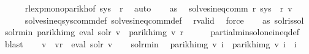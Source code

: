 \begin{isabellebody}
\ \ \ \ \isamarkupfalse%
\ rlexp{\isacharunderscore}{\kern0pt}mono{\isacharunderscore}{\kern0pt}parikh{\isacharbrackleft}{\kern0pt}of\ {\isachardoublequoteopen}sys\ {\isacharbang}{\kern0pt}\ r{\isachardoublequoteclose}{\isacharbrackright}{\kern0pt}\ \isamarkupfalse%
\ auto\isanewline
\ \ \isamarkupfalse%
\ as\ \isamarkupfalse%
\ {\isachardoublequoteopen}solves{\isacharunderscore}{\kern0pt}ineq{\isacharunderscore}{\kern0pt}comm\ r\ {\isacharparenleft}{\kern0pt}sys{\isacharprime}{\kern0pt}\ {\isacharbang}{\kern0pt}\ r{\isacharparenright}{\kern0pt}\ v{}{\isachardoublequoteclose}\isanewline
\ \ \ \ \isamarkupfalse%
\ solves{\isacharunderscore}{\kern0pt}ineq{\isacharunderscore}{\kern0pt}sys{\isacharunderscore}{\kern0pt}comm{\isacharunderscore}{\kern0pt}def\ solves{\isacharunderscore}{\kern0pt}ineq{\isacharunderscore}{\kern0pt}comm{\isacharunderscore}{\kern0pt}def\ \isamarkupfalse%
\ r{\isacharunderscore}{\kern0pt}valid\ \isamarkupfalse%
\ force\isanewline
\ \ \isamarkupfalse%
\ as\ sol{\isacharunderscore}{\kern0pt}r{\isacharunderscore}{\kern0pt}is{\isacharunderscore}{\kern0pt}sol\ \isamarkupfalse%
\ sol{\isacharunderscore}{\kern0pt}r{\isacharunderscore}{\kern0pt}min{\isacharcolon}{\kern0pt}\ {\isachardoublequoteopen}parikh{\isacharunderscore}{\kern0pt}img\ {\isacharparenleft}{\kern0pt}eval\ sol{\isacharunderscore}{\kern0pt}r\ v{}{\isacharparenright}{\kern0pt}\ {\isasymsubseteq}\ parikh{\isacharunderscore}{\kern0pt}img\ {\isacharparenleft}{\kern0pt}v{}\ r{\isacharparenright}{\kern0pt}{\isachardoublequoteclose}\isanewline
\ \ \ \ \isamarkupfalse%
\ partial{\isacharunderscore}{\kern0pt}min{\isacharunderscore}{\kern0pt}sol{\isacharunderscore}{\kern0pt}one{\isacharunderscore}{\kern0pt}ineq{\isacharunderscore}{\kern0pt}def\ \isamarkupfalse%
\ blast\isanewline
\isanewline
\ \ \isamarkupfalse%
\ {\isacharquery}{\kern0pt}v{\isacharprime}{\kern0pt}\ {\isacharequal}{\kern0pt}\ {\isachardoublequoteopen}v{}{\isacharparenleft}{\kern0pt}r\ {\isacharcolon}{\kern0pt}{\isacharequal}{\kern0pt}\ eval\ sol{\isacharunderscore}{\kern0pt}r\ v{}{\isacharparenright}{\kern0pt}{\isachardoublequoteclose}\isanewline
\ \ \isamarkupfalse%
\ sol{\isacharunderscore}{\kern0pt}r{\isacharunderscore}{\kern0pt}min\ \isamarkupfalse%
\ {\isachardoublequoteopen}parikh{\isacharunderscore}{\kern0pt}img\ {\isacharparenleft}{\kern0pt}{\isacharquery}{\kern0pt}v{\isacharprime}{\kern0pt}\ i{\isacharparenright}{\kern0pt}\ {\isasymsubseteq}\ parikh{\isacharunderscore}{\kern0pt}img\ {\isacharparenleft}{\kern0pt}v{}\ i{\isacharparenright}{\kern0pt}{\isachardoublequoteclose}\ \ i\ \isamarkupfalse%

\end{isabellebody}
